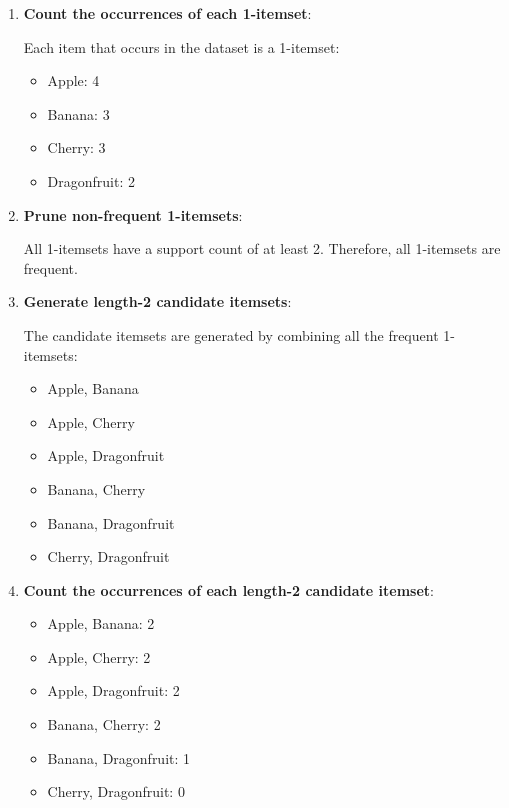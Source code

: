 \documentclass[
english,
smallborders
]{i6prcsht}
\begin{document}
\begin{solution}	
	\begin{enumerate}	
		\item \textbf{Count the occurrences of each 1-itemset}:
		      
		      Each item that occurs in the dataset is a 1-itemset:
		      
		      \begin{itemize}	
			      \item Apple: 4
			      \item Banana: 3
			      \item Cherry: 3
			      \item Dragonfruit: 2
		      \end{itemize}
		      
		\item \textbf{Prune non-frequent 1-itemsets}:
		      
		      All 1-itemsets have a support count of at least 2. Therefore, all 1-itemsets are frequent.
		      
		\item \textbf{Generate length-2 candidate itemsets}:
		      
		      The candidate itemsets are generated by combining all the frequent 1-itemsets:
		      
		      \begin{itemize}	
			      \item Apple, Banana
			      \item Apple, Cherry
			      \item Apple, Dragonfruit
			      \item Banana, Cherry
			      \item Banana, Dragonfruit
			      \item Cherry, Dragonfruit
		      \end{itemize}
		      
		\item \textbf{Count the occurrences of each length-2 candidate itemset}:
		      
		      \begin{itemize}	
			      \item Apple, Banana: 2
			      \item Apple, Cherry: 2
			      \item Apple, Dragonfruit: 2
			      \item Banana, Cherry: 2
			      \item Banana, Dragonfruit: 1
			      \item Cherry, Dragonfruit: 0
		      \end{itemize}
		      

\end{enumerate}
\end{solution}
\end{document}
